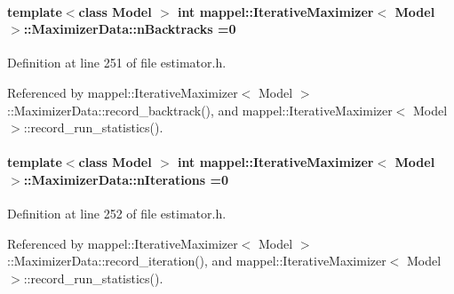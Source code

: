 \paragraph[{\texorpdfstring{n\+Backtracks}{nBacktracks}}]{\setlength{\rightskip}{0pt plus 5cm}template$<$class Model $>$ int {\bf mappel\+::\+Iterative\+Maximizer}$<$ Model $>$\+::Maximizer\+Data\+::n\+Backtracks =0}\hypertarget{classmappel_1_1IterativeMaximizer_1_1MaximizerData_a7caa78309de84e0ab4815fc00fbd6cf5}{}\label{classmappel_1_1IterativeMaximizer_1_1MaximizerData_a7caa78309de84e0ab4815fc00fbd6cf5}


Definition at line 251 of file estimator.\+h.



Referenced by mappel\+::\+Iterative\+Maximizer$<$ Model $>$\+::\+Maximizer\+Data\+::record\+\_\+backtrack(), and mappel\+::\+Iterative\+Maximizer$<$ Model $>$\+::record\+\_\+run\+\_\+statistics().

\paragraph[{\texorpdfstring{n\+Iterations}{nIterations}}]{\setlength{\rightskip}{0pt plus 5cm}template$<$class Model $>$ int {\bf mappel\+::\+Iterative\+Maximizer}$<$ Model $>$\+::Maximizer\+Data\+::n\+Iterations =0}\hypertarget{classmappel_1_1IterativeMaximizer_1_1MaximizerData_a7ee453c4ba6108b9c0cbce345b0ee4da}{}\label{classmappel_1_1IterativeMaximizer_1_1MaximizerData_a7ee453c4ba6108b9c0cbce345b0ee4da}


Definition at line 252 of file estimator.\+h.



Referenced by mappel\+::\+Iterative\+Maximizer$<$ Model $>$\+::\+Maximizer\+Data\+::record\+\_\+iteration(), and mappel\+::\+Iterative\+Maximizer$<$ Model $>$\+::record\+\_\+run\+\_\+statistics().

